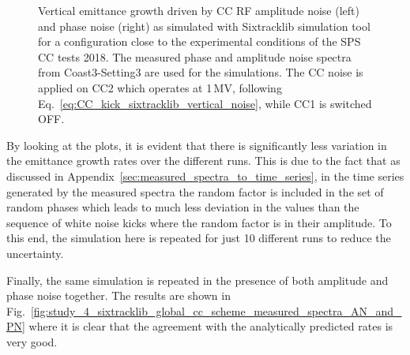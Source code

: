 \begin{figure}[htp]
\begin{subfigure}{.45\textwidth}
    \end{subfigure}
    \caption{Vertical emittance growth driven by CC RF amplitude noise (left) and phase noise (right) as simulated with Sixtracklib simulation tool for a configuration close to the experimental conditions of the SPS CC tests 2018. The measured phase and amplitude noise spectra from Coast3-Setting3 are used for the simulations. The CC noise is applied on CC2 which operates at 1\,MV, following Eq.~\eqref{eq:CC_kick_sixtracklib_vertical_noise}, while CC1 is switched OFF.}
    \label{fig:study_4_sixtracklib_global_cc_scheme_measured_spectra}
\end{figure}

By looking at the plots, it is evident that there is significantly less variation in the emittance growth rates over the different runs. This is due to the fact that as discussed in Appendix~\ref{sec:measured_spectra_to_time_series}, in the time series generated by the measured spectra the random factor is included in the set of random phases which leads to much less deviation in the values than the sequence of white noise kicks where the random factor is in their amplitude. To this end, the simulation here is repeated for just 10 different runs to reduce the uncertainty.

Finally, the same simulation is repeated in the presence of both amplitude and phase noise together. The results are shown in Fig.~\ref{fig:study_4_sixtracklib_global_cc_scheme_measured_spectra_AN_and_PN} where it is clear that the agreement with the analytically predicted rates is very good. 


